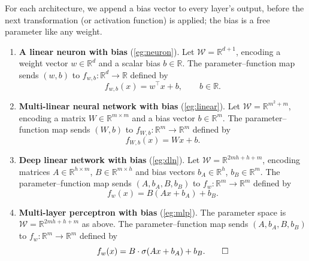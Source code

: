 \documentclass[11pt]{article}
\newcommand{\R}{\mathbb{R}}
\newcommand{\W}{\mathcal{W}}
\begin{document}
\begin{solution}
For each architecture, we append a bias vector to every layer's output, before the next transformation (or activation function) is applied; the bias is a free parameter like any weight.

\begin{enumerate}
    \item \textbf{A linear neuron with bias} (\cref{eg:neuron}).
    Let $\W = \R^{d+1}$, encoding a weight vector $w \in \R^d$ and a scalar bias $b \in \R$. The parameter--function map sends $(w, b)$ to $f_{w,b} : \R^d \to \R$ defined by
    \begin{equation*}
        f_{w,b}(x) = w^\top x + b, \qquad b \in \R.
    \end{equation*}

    \item \textbf{Multi-linear neural network with bias} (\cref{eg:linear}).
    Let $\W = \R^{m^2 + m}$, encoding a matrix $W \in \R^{m \times m}$ and a bias vector $b \in \R^m$. The parameter--function map sends $(W, b)$ to $f_{W,b} : \R^m \to \R^m$ defined by
    \begin{equation*}
        f_{W,b}(x) = Wx + b.
    \end{equation*}

    \item \textbf{Deep linear network with bias} (\cref{eg:dln}).
    Let $\W = \R^{2mh + h + m}$, encoding matrices $A \in \R^{h \times m}$, $B \in \R^{m \times h}$ and bias vectors $b_A \in \R^h$, $b_B \in \R^m$. The parameter--function map sends $(A, b_A, B, b_B)$ to $f_w : \R^m \to \R^m$ defined by
    \begin{equation*}
        f_w(x) = B(Ax + b_A) + b_B.
    \end{equation*}

    \item \textbf{Multi-layer perceptron with bias} (\cref{eg:mlp}).
    The parameter space is $\W = \R^{2mh + h + m}$ as above. The parameter--function map sends $(A, b_A, B, b_B)$ to $f_w : \R^m \to \R^m$ defined by
    \begin{equation*}
        f_w(x) = B \cdot \sigma(Ax + b_A) + b_B. \qedhere
    \end{equation*}
\end{enumerate}
\end{solution}
\end{document}
